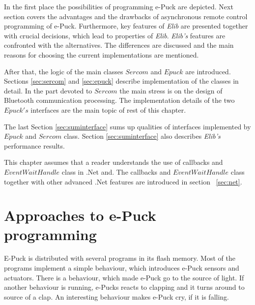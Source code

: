 \documentclass[12pt,notitlepage]{report}
\begin{document}
	In the first place the possibilities of programming e-Puck are depicted.
	Next section covers the advantages and the drawbacks of asynchronous remote control programming of e-Puck.
	Furthermore, key features of {\it Elib} are presented together with crucial decisions, which
	lead to properties of {\it Elib}. 
	{\it Elib's} features are confronted with the alternatives. The differences are discussed
	and the main reasons for choosing the current implementations are mentioned.

	After that, the logic of the main classes $Sercom$ and $Epuck$ are introduced. Sections 
	\ref{sec:sercom} and \ref{sec:epuck} describe implementation of the classes in detail. 
	In the part devoted to $Sercom$ the main stress is on the design of Bluetooth communication processing.
	The implementation details of the two $Epuck's$ interfaces are the main topic of rest of this chapter. 

	The last Section \ref{sec:suminterface} sums up qualities of interfaces 
	implemented by $Epuck$ and $Sercom$ class.
	Section \ref{sec:suminterface} also describes {\it Elib's} performance results.

	This chapter assumes that a reader understands the use of callbacks and $EventWaitHandle$ class in .Net and.
	The callbacks and $EventWaitHandle$ class together with other advanced .Net features 
	are introduced in section ~\ref{sec:net}.
  
\section{Approaches to e-Puck programming} \label{sec:approach}
	E-Puck is distributed with several programs in its flash memory. 
	Most of the programs implement a simple behaviour, which introduces e-Puck sensors and actuators.
	There is a behaviour, which made e-Puck go to the source of light.
	If another behaviour is running, e-Pucks
	reacts to clapping and it turns around to source of a clap. An interesting behaviour makes
	e-Puck cry, if it is falling.
	 
\end{document}
